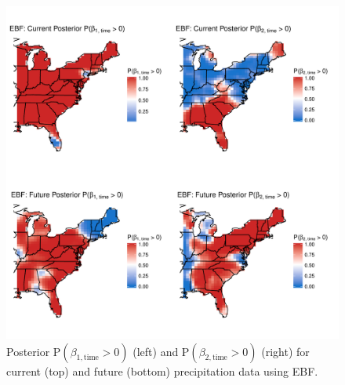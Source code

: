 \documentclass[11pt]{article}
\begin{document}
\begin{figure}[htbp]  %
  \centering
  \includegraphics[width=\linewidth]{plots/precip-ebf-post-betatimepos.pdf}
  \caption{Posterior P$(\beta_{1, \text{time}} > 0)$ (left) and P$(\beta_{2, \text{time}} > 0)$ (right) for current (top) and future (bottom) precipitation data using EBF.}
  \label{ebfig:fire-ebfpostbeta1pos}
\end{figure}
\end{document}
